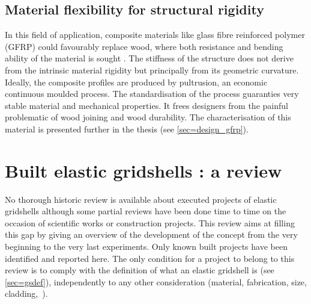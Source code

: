 \subsection{Material flexibility for structural rigidity}\label{sec=def_flexibility}
In this field of application, composite materials like glass fibre reinforced polymer (GFRP) could favourably replace wood, where both resistance and bending ability of the material is sought \cite{Douthe2010a}. The stiffness of the structure does not derive from the intrinsic material rigidity but principally from its geometric curvature. Ideally, the composite profiles are produced by pultrusion, an economic continuous moulded process. The standardisation of the process guaranties very stable material and mechanical properties. It frees designers from the painful problematic of wood joining and wood durability. The characterisation of this material is presented further in the thesis (see \cref{sec=design_gfrp}).


\section{Built elastic gridshells : a review}\label{sec=review_project}


No thorough historic review is available about executed projects of elastic gridshells although some partial reviews have been done time to time on the occasion of scientific works or construction projects. This review aims at filling this gap by giving an overview of the development of the concept from the very beginning to the very last experiments. Only known built projects have been identified and reported here. The only condition for a project to belong to this review is to comply with the definition of what an elastic gridshell is (see \cref{sec=gsdef}), independently to any other consideration (material, fabrication, size, cladding,~\telp{}).

